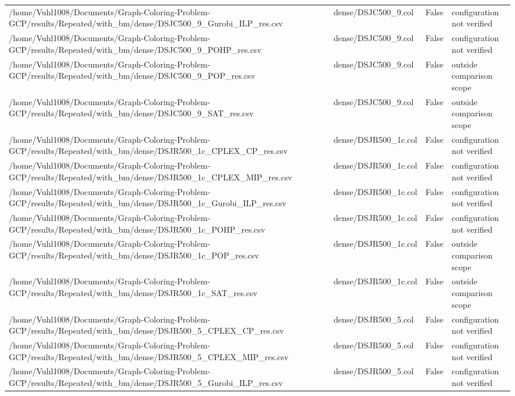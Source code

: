 \begin{table}[htbp]
\begin{tabular}{llll}
/home/Vuhl1008/Documents/Graph-Coloring-Problem-GCP/results/Repeated/with\_bm/dense/DSJC500\_9\_Gurobi\_ILP\_res.csv & dense/DSJC500\_9.col & False & configuration not verified \\
/home/Vuhl1008/Documents/Graph-Coloring-Problem-GCP/results/Repeated/with\_bm/dense/DSJC500\_9\_POHP\_res.csv & dense/DSJC500\_9.col & False & configuration not verified \\
/home/Vuhl1008/Documents/Graph-Coloring-Problem-GCP/results/Repeated/with\_bm/dense/DSJC500\_9\_POP\_res.csv & dense/DSJC500\_9.col & False & outside comparison scope \\
/home/Vuhl1008/Documents/Graph-Coloring-Problem-GCP/results/Repeated/with\_bm/dense/DSJC500\_9\_SAT\_res.csv & dense/DSJC500\_9.col & False & outside comparison scope \\
/home/Vuhl1008/Documents/Graph-Coloring-Problem-GCP/results/Repeated/with\_bm/dense/DSJR500\_1c\_CPLEX\_CP\_res.csv & dense/DSJR500\_1c.col & False & configuration not verified \\
/home/Vuhl1008/Documents/Graph-Coloring-Problem-GCP/results/Repeated/with\_bm/dense/DSJR500\_1c\_CPLEX\_MIP\_res.csv & dense/DSJR500\_1c.col & False & configuration not verified \\
/home/Vuhl1008/Documents/Graph-Coloring-Problem-GCP/results/Repeated/with\_bm/dense/DSJR500\_1c\_Gurobi\_ILP\_res.csv & dense/DSJR500\_1c.col & False & configuration not verified \\
/home/Vuhl1008/Documents/Graph-Coloring-Problem-GCP/results/Repeated/with\_bm/dense/DSJR500\_1c\_POHP\_res.csv & dense/DSJR500\_1c.col & False & configuration not verified \\
/home/Vuhl1008/Documents/Graph-Coloring-Problem-GCP/results/Repeated/with\_bm/dense/DSJR500\_1c\_POP\_res.csv & dense/DSJR500\_1c.col & False & outside comparison scope \\
/home/Vuhl1008/Documents/Graph-Coloring-Problem-GCP/results/Repeated/with\_bm/dense/DSJR500\_1c\_SAT\_res.csv & dense/DSJR500\_1c.col & False & outside comparison scope \\
/home/Vuhl1008/Documents/Graph-Coloring-Problem-GCP/results/Repeated/with\_bm/dense/DSJR500\_5\_CPLEX\_CP\_res.csv & dense/DSJR500\_5.col & False & configuration not verified \\
/home/Vuhl1008/Documents/Graph-Coloring-Problem-GCP/results/Repeated/with\_bm/dense/DSJR500\_5\_CPLEX\_MIP\_res.csv & dense/DSJR500\_5.col & False & configuration not verified \\
/home/Vuhl1008/Documents/Graph-Coloring-Problem-GCP/results/Repeated/with\_bm/dense/DSJR500\_5\_Gurobi\_ILP\_res.csv & dense/DSJR500\_5.col & False & configuration not verified \\

\end{tabular}
\end{table}
